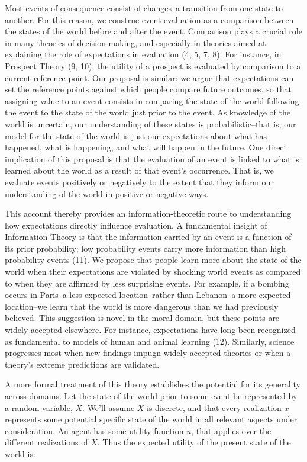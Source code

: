 \documentclass[9pt,twocolumn,twoside,lineno]{pnas-new}
\begin{document}
Most events of consequence consist of changes--a transition from one
state to another. For this reason, we construe event evaluation as a
comparison between the states of the world before and after the event.
Comparison plays a crucial role in many theories of decision-making, and
especially in theories aimed at explaining the role of expectations in
evaluation (4, 5, 7, 8). For instance, in Prospect Theory (9, 10), the
utility of a prospect is evaluated by comparison to a current reference
point. Our proposal is similar: we argue that expectations can set the
reference points against which people compare future outcomes, so that
assigning value to an event consists in comparing the state of the world
following the event to the state of the world just prior to the event.
As knowledge of the world is uncertain, our understanding of these
states is probabilistic--that is, our model for the state of the world
is just our expectations about what has happened, what is happening, and
what will happen in the future. One direct implication of this proposal
is that the evaluation of an event is linked to what is learned about
the world as a result of that event's occurrence. That is, we evaluate
events positively or negatively to the extent that they inform our
understanding of the world in positive or negative ways.

This account thereby provides an information-theoretic route to
understanding how expectations directly influence evaluation. A
fundamental insight of Information Theory is that the information
carried by an event is a function of its prior probability; low
probability events carry more information than high probability events
(11). We propose that people learn more about the state of the world
when their expectations are violated by shocking world events as
compared to when they are affirmed by less surprising events. For
example, if a bombing occurs in Paris--a less expected location--rather
than Lebanon--a more expected location--we learn that the world is more
dangerous than we had previously believed. This suggestion is novel in
the moral domain, but these points are widely accepted elsewhere. For
instance, expectations have long been recognized as fundamental to
models of human and animal learning (12). Similarly, science progresses
most when new findings impugn widely-accepted theories or when a
theory's extreme predictions are validated.

A more formal treatment of this theory establishes the potential for its
generality across domains. Let the state of the world prior to some
event be represented by a random variable, \(X\). We'll assume \(X\) is
discrete, and that every realization \(x\) represents some potential
specific state of the world in all relevant aspects under consideration.
An agent has some utility function \(u\), that applies over the
different realizations of \(X\). Thus the expected utility of the
present state of the world is:
\end{document}
